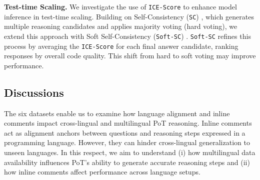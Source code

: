 % 
\textbf{Test-time Scaling.} We investigate the use of \texttt{ICE-Score} to enhance model inference in test-time scaling. Building on Self-Consistency (\texttt{SC}) \cite{wang2023selfconsistency}, which generates multiple reasoning candidates and applies majority voting (hard voting), we extend this approach with Soft Self-Consistency (\texttt{Soft-SC}) \cite{soft-sc}.
\texttt{Soft-SC} refines this process by averaging the \texttt{ICE-Score} for each final answer candidate, ranking responses by overall code quality. This shift from hard to soft voting may improve performance.

\subsection{Discussions}



The six datasets enable us to examine how language alignment and inline comments impact cross-lingual and multilingual PoT reasoning. 
%
Inline comments act as alignment anchors between questions and reasoning steps expressed in a programming language. 
%
However, they can hinder cross-lingual generalization to unseen languages. 
%
In this respect, we aim to understand (i) how multilingual data availability influences PoT’s ability to generate accurate reasoning steps and (ii) how inline comments affect performance across language setups.
% 


